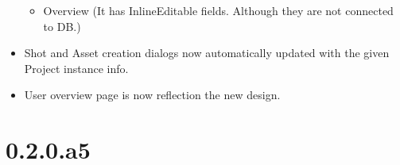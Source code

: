 \documentclass[a4paper,10pt,english]{sphinxmanual}
\begin{document}
\begin{itemize}
\begin{itemize}
\item {} 
Overview  (It has InlineEditable fields. Although they are not connected
to DB.)

\end{itemize}

\item {} 
Shot and Asset creation dialogs now automatically updated with the given
Project instance info.

\item {} 
User overview page is now reflection the new design.

\end{itemize}


\section{0.2.0.a5}
\end{document}
